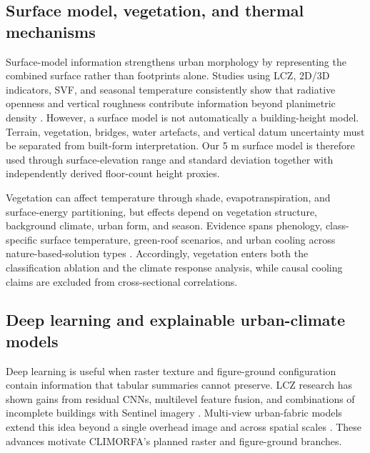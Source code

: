 \subsection{Surface model, vegetation, and thermal mechanisms}

Surface-model information strengthens urban morphology by representing the combined
surface rather than footprints alone. Studies using LCZ, 2D/3D indicators,
SVF, and seasonal temperature consistently show that radiative openness and
vertical roughness contribute information beyond planimetric density
\citep{wang2018AssessinLocal,zhou2022UnderstaEffects,
ma2024XgboostBased,wang2025SeasonalEffects}. However, a surface model is not automatically
a building-height model. Terrain, vegetation, bridges, water artefacts, and
vertical datum uncertainty must be separated from built-form interpretation.
Our 5 m surface model is therefore used through surface-elevation range and standard
deviation together with independently derived floor-count height proxies.

Vegetation can affect temperature through shade, evapotranspiration, and
surface-energy partitioning, but effects depend on vegetation structure,
background climate, urban form, and season. Evidence spans phenology,
class-specific surface temperature, green-roof scenarios, and urban cooling
across nature-based-solution types \citep{kabano2021EvidenceUrban,
wang2023EffectivFactors,sanchez2025AssessinSpatial,wei2025UrbanCooling}.
Accordingly, vegetation enters both the classification ablation and the climate
response analysis, while causal cooling claims are excluded from cross-sectional
correlations.

\subsection{Deep learning and explainable urban-climate models}

Deep learning is useful when raster texture and figure-ground configuration
contain information that tabular summaries cannot preserve. LCZ research has
shown gains from residual CNNs, multilevel feature fusion, and combinations of
incomplete buildings with Sentinel imagery \citep{qiu2018FeatureImportan,
qiu2020MultilevFeature,yoo2020ImprovinLocal}. Multi-view urban-fabric models
extend this idea beyond a single overhead image and across spatial scales
\citep{fang2024UrbanclaDeep}. These advances motivate CLIMORFA's planned raster
and figure-ground branches.

